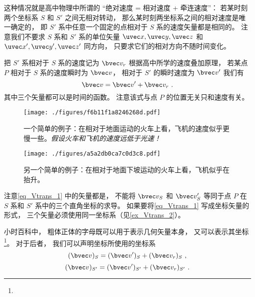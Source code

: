 

这种情况就是高中物理中所谓的 “绝对速度 = 相对速度 + 牵连速度”： 若某时刻两个坐标系 $S$ 和 $S'$ 之间无相对转动， 那么某时刻两坐标系之间的相对速度是唯一确定的， 即 $S'$ 系中任意一个固定的点相对于 $S$ 系的速度矢量都是相同的。 注意我们不要求 $S$ 系和 $S'$ 系的单位矢量 $\uvec x, \uvec y, \uvec z$ 和 $\uvec x', \uvec y', \uvec z'$ 同方向， 只要求它们的相对方向不随时间变化。

把 $S'$ 系相对于 $S$ 系的速度记为 $\bvec v_r$ 根据高中所学的速度叠加原理， 若某点 $P$ 相对于 $S$ 系的速度瞬时为 $\bvec v$， 相对于 $S'$ 的瞬时速度为 $\bvec v'$ 我们有
\begin{equation}\label{eq_Vtrans_1}
\bvec v = \bvec v' + \bvec v_r~.
\end{equation}
其中三个矢量都可以是时间的函数。 注意该式与点 $P$ 的位置无关只和速度有关。

\begin{figure}[ht]
\centering
\texttt{[image: ./figures/f6b11f1a8246268d.pdf]}
\caption{一个简单的例子：在相对于地面运动的火车上看，飞机的速度似乎更慢一些。\textsl{假设火车和飞机的速度远低于光速！}} \label{fig_Vtrans_1}
\end{figure}

\begin{figure}[ht]
\centering
\texttt{[image: ./figures/a5a2db0ca7c0d3c8.pdf]}
\caption{另一个简单的例子：在相对于地面下坡运动的火车上看，飞机似乎在抬升。} \label{fig_Vtrans_2}
\end{figure}

注意\autoref{eq_Vtrans_1} 中的矢量都是， 不能将 $\bvec v_S$ 和 $\bvec v_S'$ 等同于点 $P$ 在 $S$ 系和 $S'$ 系中的三个直角坐标的求导。 如果要将\autoref{eq_Vtrans_1} 写成坐标矢量的形式， 三个矢量必须使用同一坐标系（见\autoref{ex_Vtrans_2}）。

小时百科中， 粗体正体的字母既可以用于表示几何矢量本身， 又可以表示其坐标\footnote{}。 对于后者， 我们可以声明坐标所使用的坐标系
\begin{equation}\label{eq_Vtrans_5}
(\bvec v)_{S} = (\bvec v')_{S} + (\bvec v_r)_{S}~,
\end{equation}
\begin{equation}\label{eq_Vtrans_6}
(\bvec v)_{S'} = (\bvec v')_{S'} + (\bvec v_r)_{S'}~.
\end{equation}

